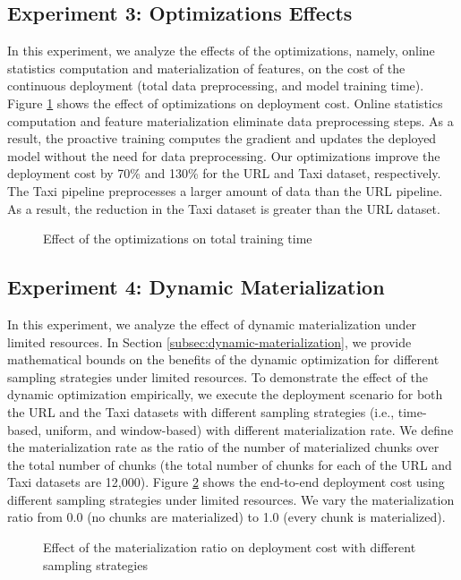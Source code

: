 \subsection{Experiment 3: Optimizations Effects}
In this experiment, we analyze the effects of the optimizations, namely, online statistics computation and materialization of features, on the cost of the continuous deployment (total data preprocessing, and model training time).
Figure \ref{optimization-effect} shows the effect of optimizations on deployment cost.
Online statistics computation and feature materialization eliminate data preprocessing steps.
As a result, the proactive training computes the gradient and updates the deployed model without the need for data preprocessing.
Our optimizations improve the deployment cost by 70\% and 130\% for the URL and Taxi dataset, respectively.
The Taxi pipeline preprocesses a larger amount of data than the URL pipeline.
As a result, the reduction in the Taxi dataset is greater than the URL dataset.
\begin{figure}[h!]
\centering
\resizebox{\columnwidth}{!}{}
\caption{Effect of the optimizations on total training time}
\label{optimization-effect}
\end{figure}

\subsection{Experiment 4: Dynamic Materialization}
In this experiment, we analyze the effect of dynamic materialization under limited resources.
In Section \ref{subsec:dynamic-materialization}, we provide mathematical bounds on the benefits of the dynamic optimization for different sampling strategies under limited resources.
To demonstrate the effect of the dynamic optimization empirically, we execute the deployment scenario for both the URL and the Taxi datasets with different sampling strategies (i.e., time-based, uniform, and window-based) with different materialization rate.
We define the materialization rate as the ratio of the number of materialized chunks over the total number of chunks (the total number of chunks for each of the URL and Taxi datasets are 12,000).
Figure \ref{fig-dynamic-materialization} shows the end-to-end deployment cost using different sampling strategies under limited resources.
We vary the materialization ratio from 0.0 (no chunks are materialized) to 1.0 (every chunk is materialized).
\begin{figure}[!h]
\centering
\resizebox{\columnwidth}{!}{}
\caption{Effect of the materialization ratio on deployment cost with different sampling strategies}
\label{fig-dynamic-materialization}
\end{figure}

